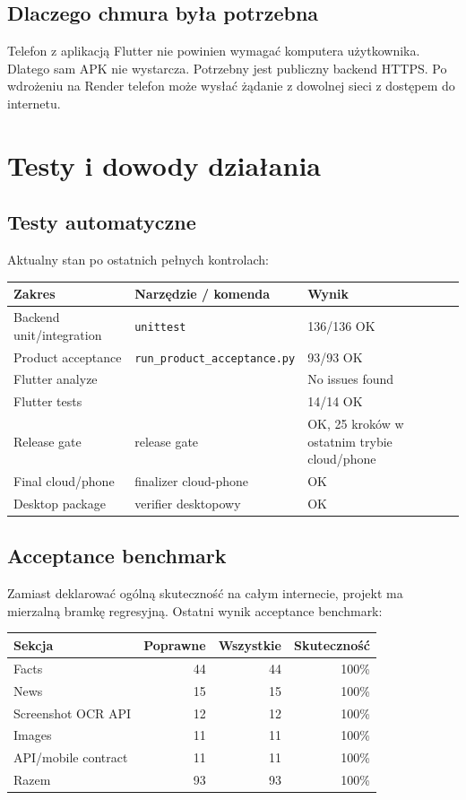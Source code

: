 \documentclass[12pt,a4paper]{article}
\begin{document}
\subsection{Dlaczego chmura była potrzebna}
Telefon z aplikacją Flutter nie powinien wymagać komputera użytkownika.
Dlatego sam APK nie wystarcza.
Potrzebny jest publiczny backend HTTPS.
Po wdrożeniu na Render telefon może wysłać żądanie z dowolnej sieci z dostępem do internetu.

\section{Testy i dowody działania}
\subsection{Testy automatyczne}
Aktualny stan po ostatnich pełnych kontrolach:
\begin{center}
\footnotesize
\begin{tabularx}{\textwidth}{p{}p{}Y}
\toprule
Zakres & Narzędzie / komenda & Wynik \\
\midrule
Backend unit/integration & \texttt{unittest} & 136/136 OK \\
Product acceptance & \texttt{run\_product\_acceptance.py} & 93/93 OK \\
Flutter analyze &  & No issues found \\
Flutter tests &  & 14/14 OK \\
Release gate & release gate & OK, 25 kroków w ostatnim trybie cloud/phone \\
Final cloud/phone & finalizer cloud-phone & OK \\
Desktop package & verifier desktopowy & OK \\
\bottomrule
\end{tabularx}
\end{center}

\subsection{Acceptance benchmark}
Zamiast deklarować ogólną skuteczność na całym internecie, projekt ma mierzalną bramkę regresyjną.
Ostatni wynik acceptance benchmark:
\begin{center}
\begin{tabular}{lrrr}
\toprule
Sekcja & Poprawne & Wszystkie & Skuteczność \\
\midrule
Facts & 44 & 44 & 100\% \\
News & 15 & 15 & 100\% \\
Screenshot OCR API & 12 & 12 & 100\% \\
Images & 11 & 11 & 100\% \\
API/mobile contract & 11 & 11 & 100\% \\
\midrule
Razem & 93 & 93 & 100\% \\
\bottomrule
\end{tabular}
\end{center}
\end{document}
